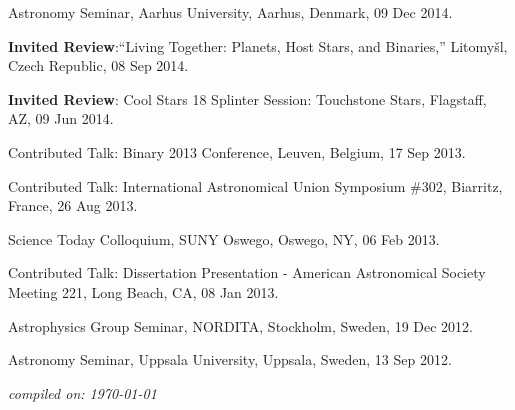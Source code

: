 \documentclass[12pt, a4paper]{article}
\begin{document}
\begin{etaremune}[leftmargin=0.30in]
    \item Astronomy Seminar, Aarhus University, Aarhus, Denmark, 09 Dec 2014.
	  
    \item {\bf Invited Review}:``Living Together: Planets, Host Stars, and Binaries,'' Litomy\v{s}l, Czech Republic, 08 Sep 2014. 
     
    \item {\bf Invited Review}: Cool Stars 18 Splinter Session: Touchstone Stars, Flagstaff, AZ, 09 Jun 2014.

    \item Contributed Talk: Binary 2013 Conference, Leuven, Belgium, 17 Sep 2013.

    \item Contributed Talk: International Astronomical Union Symposium \#302, Biarritz, France, 26 Aug 2013.

    \item Science Today Colloquium, SUNY Oswego, Oswego, NY, 06 Feb 2013.

    \item Contributed Talk: Dissertation Presentation - American Astronomical Society Meeting 221, Long Beach, CA, 08 Jan 2013.

    \item Astrophysics Group Seminar, NORDITA, Stockholm, Sweden, 19 Dec 2012.

    \item Astronomy Seminar, Uppsala University, Uppsala, Sweden, 13 Sep 2012.
    
\end{etaremune}

\vspace{2\baselineskip}

\begin{flushright}
	\emph{\footnotesize compiled on: \today}
\end{flushright}
\end{document}

